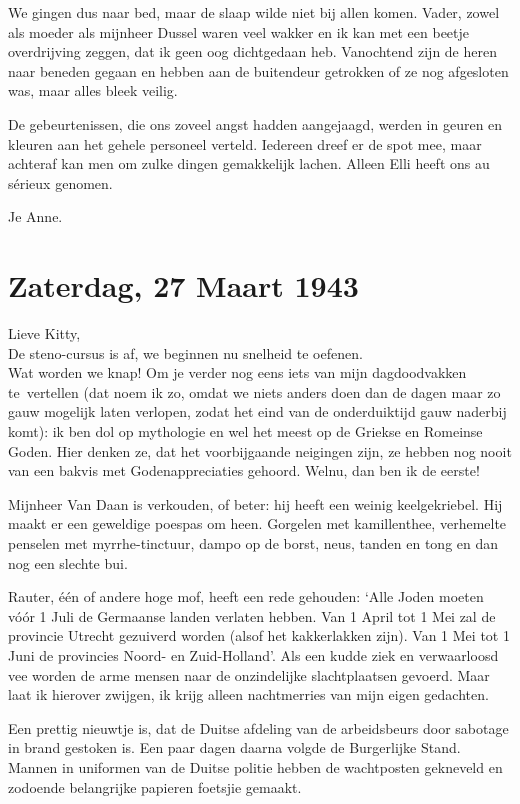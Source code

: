 \documentclass{book}
\begin{document}
We gingen dus naar bed, maar de slaap wilde niet bij allen komen. Vader, zowel
als moeder als mijnheer Dussel waren veel wakker en ik kan met een beetje
overdrijving zeggen, dat ik geen oog dichtgedaan heb. Vanochtend zijn de heren
naar beneden gegaan en hebben aan de buitendeur getrokken of ze nog afgesloten
was, maar alles bleek veilig.

De gebeurtenissen, die ons zoveel angst hadden aangejaagd, werden in geuren en
kleuren aan het gehele personeel verteld. Iedereen dreef er de spot mee, maar
achteraf kan men om zulke dingen gemakkelijk lachen.  Alleen Elli heeft ons au
sérieux genomen.

Je Anne.

\section*{Zaterdag, 27 Maart 1943}

Lieve Kitty,\\
De steno-cursus is af, we beginnen nu snelheid te oefenen.\\
Wat
worden we knap! Om je verder nog eens iets van mijn dagdoodvakken te~vertellen
(dat noem ik zo, omdat we niets anders doen dan de dagen maar zo gauw mogelijk
laten verlopen, zodat het eind van de onderduiktijd gauw naderbij komt): ik ben
dol op mythologie en wel het meest op de Griekse en Romeinse Goden. Hier denken
ze, dat het voorbijgaande neigingen zijn, ze hebben nog nooit van een bakvis met
Godenappreciaties gehoord. Welnu, dan ben ik de eerste!

Mijnheer Van Daan is verkouden, of beter: hij heeft een weinig keelgekriebel.
Hij maakt er een geweldige poespas om heen. Gorgelen met kamillenthee,
verhemelte penselen met myrrhe-tinctuur, dampo op de borst, neus, tanden en tong
en dan nog een slechte bui.

Rauter, één of andere hoge mof, heeft een rede gehouden: `Alle Joden moeten vóór
1 Juli de Germaanse landen verlaten hebben. Van 1 April tot 1 Mei zal de
provincie Utrecht gezuiverd worden (alsof het kakkerlakken zijn). Van 1 Mei tot
1 Juni de provincies Noord- en Zuid-Holland'. Als een kudde ziek en verwaarloosd
vee worden de arme mensen naar de onzindelijke slachtplaatsen gevoerd. Maar laat
ik hierover zwijgen, ik krijg alleen nachtmerries van mijn eigen gedachten.

Een prettig nieuwtje is, dat de Duitse afdeling van de arbeidsbeurs door
sabotage in brand gestoken is. Een paar dagen daarna volgde de Burgerlijke
Stand. Mannen in uniformen van de Duitse politie hebben de wachtposten gekneveld
en zodoende belangrijke papieren foetsjie gemaakt.
\end{document}
